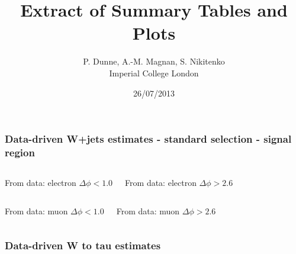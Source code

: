 \documentclass[red,compress,xcolor=table]{beamer}
\title%
{Extract of Summary Tables and Plots}
\subtitle
{} %
\author[A.-M. Magnan] %
{P. Dunne, A.-M. Magnan, S. Nikitenko\\
  Imperial College London}
\date[26/07/2013] %
{26/07/2013}
\begin{document}
\begin{frame}
  \titlepage
\end{frame}

\begin{frame}
  \frametitle{Data-driven W+jets estimates - standard selection - signal region}

\begin{columns}
  \begin{block}{\scriptsize From data: electron $\Delta\phi<1.0$}
    {\tiny
      
    }
  \end{block}
  \begin{block}{\scriptsize From data: electron  $\Delta\phi>2.6$}
    {\tiny
      
    }
  \end{block}
\end{columns}
\begin{columns}
  \begin{block}{\scriptsize From data: muon  $\Delta\phi<1.0$}
    {\tiny
      
    }
  \end{block}
  \begin{block}{\scriptsize From data: muon $\Delta\phi>2.6$}
    {\tiny
      
    }
  \end{block}
\end{columns}


\end{frame}



\begin{frame}
  \frametitle{Data-driven W to tau estimates}

\begin{center}
    {\tiny
      
    }
\end{center}

\end{frame}
\end{document}
